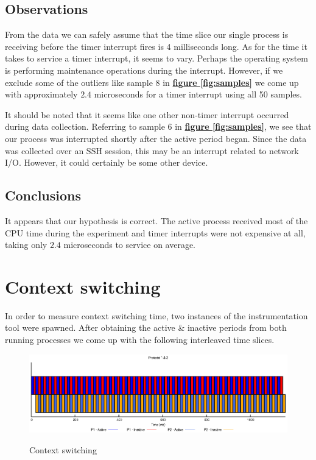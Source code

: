 \documentclass[oneside]{amsart}
\theoremstyle{definition}
\theoremstyle{remark}
\numberwithin{equation}{section}
\begin{document}
\subsection{Observations}
From the data we can safely assume that the time slice our single process is receiving before the
timer interrupt fires is 4 milliseconds long. As for the time it takes to service a timer interrupt,
it seems to vary. Perhaps the operating system is performing maintenance operations during the
interrupt. However, if we exclude some of the outliers like sample 8 in
\hyperref[fig:samples]{\textbf{figure \ref*{fig:samples}}} we come up with approximately $2.4$
microseconds for a timer interrupt using all 50 samples.

It should be noted that it seems like one other non-timer interrupt occurred during data collection.
Referring to sample 6 in \hyperref[fig:samples]{\textbf{figure \ref*{fig:samples}}}, we see that our
process was interrupted shortly after the active period began. Since the data was collected over an
SSH session, this may be an interrupt related to network I/O. However, it could certainly be some
other device.

\subsection{Conclusions}
It appears that our hypothesis is correct. The active process received most of the CPU time during
the experiment and timer interrupts were not expensive at all, taking only $2.4$ microseconds to
service on average. \\

\newpage

\section{Context switching}
In order to measure context switching time, two instances of the instrumentation tool were spawned.
After obtaining the active \& inactive periods from both running processes we come up with the
following interleaved time slices.

\begin{figure}[h]
    \caption{Context switching}
    \centering
    \includegraphics[scale=1]{A1P2.eps}
    \label{fig:plot}
\end{figure}
\end{document}
